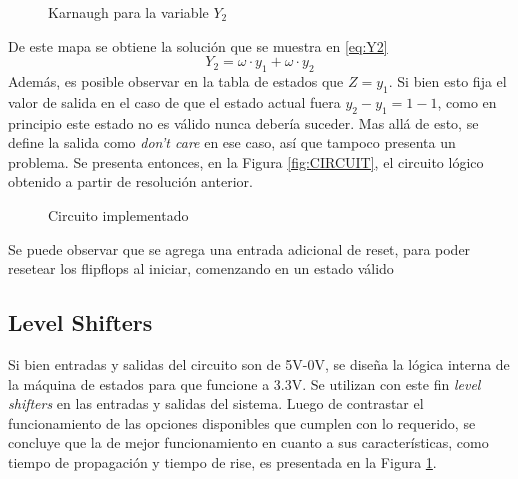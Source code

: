 \begin{figure}[H]
    \centering    
        \begin{Karnaughvuit}


        \end{Karnaughvuit}
        \caption{Karnaugh para la variable $Y_2$}    
\end{figure}
De este mapa se obtiene la soluci\'on que se muestra en \ref{eq:Y2}  
\begin{equation}
    Y_2 = \omega \cdot y_1 + \omega \cdot y_2
    \label{eq:Y2}
\end{equation}
Adem\'as, es posible observar en la tabla de estados que $Z = y_1$. Si bien esto fija el valor de salida en el caso de que el estado actual fuera $y_2-y_1 = 1-1$, como en principio este estado no es v\'alido nunca deber\'ia suceder. Mas all\'a de esto, se define la salida como \textit{don't care} en ese caso, as\'i que tampoco presenta un problema.
Se presenta entonces, en la Figura \ref{fig:CIRCUIT}, el circuito l\'ogico obtenido a partir de resoluci\'on anterior.
\begin{figure}[H]
    \centering
    \caption{Circuito implementado}
    \label{fig:LEVEL_SHIFTER}
\end{figure}
Se puede observar que se agrega una entrada adicional de reset, para poder resetear los flipflops al iniciar, comenzando en un estado v\'alido

\subsection{Level Shifters}
Si bien entradas y salidas del circuito son de 5V-0V, se dise\~na la l\'ogica interna de la m\'aquina de estados para que funcione a 3.3V. Se utilizan con este fin \textit{level shifters} en  las entradas y salidas del sistema.
Luego de contrastar el funcionamiento de las opciones disponibles que cumplen con lo requerido, se concluye que la de mejor funcionamiento en cuanto a sus caracter\'isticas, como tiempo de propagaci\'on y tiempo de rise, es presentada en la Figura \ref{fig:LEVEL_SHIFTER}.

